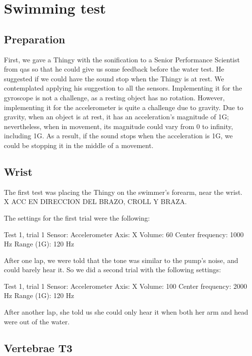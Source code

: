 \section{Swimming test}

\subsection{Preparation}
First, we gave a Thingy with the sonification to a Senior Performance Scientist from \gls{qas} so that he could give us some feedback before the water test. He suggested if we could have the sound stop when the Thingy is at rest. We contemplated applying his suggestion to all the sensors. Implementing it for the gyroscope is not a challenge, as a resting object has no rotation. However, implementing it for the accelerometer is quite a challenge due to gravity. Due to gravity, when an object is at rest, it has an acceleration's magnitude of 1G; nevertheless, when in movement, its magnitude could vary from 0 to infinity, including 1G. As a result, if the sound stops when the acceleration is 1G, we could be stopping it in the middle of a movement.

\subsection{Wrist}
The first test was placing the Thingy on the swimmer's forearm, near the wrist. X ACC EN DIRECCION DEL BRAZO, CROLL Y BRAZA.

The settings for the first trial were the following:
\begin{settings}{Test 1, trial 1}
Sensor: 					Accelerometer
Axis: 					X
Volume:					60%
Center frequency: 	1000 Hz
Range (1G):				120 Hz
\end{settings}
After one lap, we were told that the tone was similar to the pump's noise, and could barely hear it. So we did a second trial with the following settings:
\begin{settings}{Test 1, trial 1}
Sensor: 					Accelerometer
Axis: 					X
Volume:					100%
Center frequency: 	2000 Hz
Range (1G):				120 Hz
\end{settings}

After another lap, she told us she could only hear it when both her arm and head were out of the water.
\subsection{Vertebrae T3}

